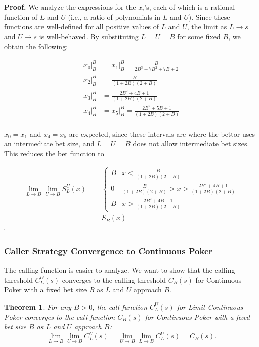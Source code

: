 \documentclass[a4paper,12pt]{article}
\theoremstyle{plain}
\newtheorem{theorem}{Theorem}[section]
\theoremstyle{definition}
\newenvironment{customproof}[1][Proof]{\noindent\textbf{#1.} }{\hfill$\square$\vspace{1em}}
\begin{document}
\begin{customproof}
We analyze the expressions for the $x_i$'s, each of which is a rational function of $L$ and $U$ (i.e., a ratio of polynomials in $L$ and $U$). Since these functions are well-defined for all positive values of $L$ and $U$, the limit as $L \to s$ and $U \to s$ is well-behaved. By substituting $L = U = B$ for some fixed $B$, we obtain the following:

\begin{align*}
    x_0|_B^B & = x_1|_B^B = \frac{B}{2 B^3+7 B^2+7 B+2} \\
    x_2|_B^B & = \frac{B}{(1+2B)(2+B)} \\
    x_3|_B^B & = \frac{2 B^2+4 B+1}{(1+2B)(2+B)} \\
    x_4|_B^B & = x_5|_B^B = \frac{2 B^2+5 B+1}{(1+2B)(2+B)} \\
\end{align*}

$x_0 = x_1$ and $x_4 = x_5$ are expected, since these intervals are where the bettor uses an intermediate bet size, and $L=U=B$ does not allow intermediate bet sizes. This reduces the bet function to 

\begin{align*}
    \lim_{L \to B} \lim_{U \to B} S_L^U(x) & = \begin{cases}
    B & x < \frac{B}{(1+2B)(2+B)}\\
    0 & \frac{B}{(1+2B)(2+B)} > x > \frac{2 B^2+4 B+1}{(1+2B)(2+B)}\\
    B & x > \frac{2 B^2+4 B+1}{(1+2B)(2+B)}
    \end{cases}\\
    &= S_B(x)
\end{align*}
\end{customproof}

\subsubsection{Caller Strategy Convergence to Continuous Poker}

The calling function is easier to analyze. We want to show that the calling threshold $C_L^U(s)$ converges to the calling threshold $C_B(s)$ for Continuous Poker with a fixed bet size $B$ as $L$ and $U$ approach $B$.

\begin{theorem}
     For any $B > 0$, the call function $C_L^U(s)$ for Limit Continuous Poker converges to the call function $C_B(s)$ for Continuous Poker with a fixed bet size $B$ as $L$ and $U$ approach $B$:
\[
\lim_{L \to B} \lim_{U \to B} C_L^U(s) = \lim_{U \to B} \lim_{L \to B} C_L^U(s) = C_B(s).
\]
\end{theorem}
\end{document}
